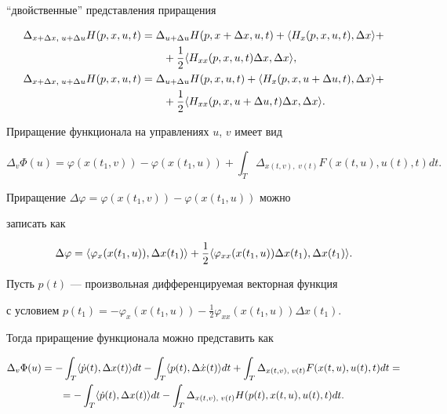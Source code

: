 ``двойственные'' представления приращения 


\begin{align}


\Delta_{x+\Delta x,\; u+\Delta u}H(p,x,u,t)&=


\Delta_{u+\Delta u}H(p,x+\Delta x,u,t)+\la


H_x(p,x,u,t),\Delta x\ra +\notag \\


&\qquad +\frac{1}{2}\la H_{xx}(p,x,u,t)\Delta x,\Delta x\ra,\\


%


\Delta_{x+\Delta x,\; u+\Delta u}H(p,x,u,t)&=


\Delta_{u+\Delta u}H(p,x,u,t)+\la H_x(p,x,u+\Delta u,t),


\Delta x\ra+ \notag \\


&\qquad +\frac{1}{2}\la H_{xx}(p,x,u+\Delta u,t)\Delta x,\Delta x\ra.


\end{align}





Приращение функционала на управлениях $u$, $v$ имеет вид


$$


\Delta_v\Phi(u)=\varphi(x(t_1,v))-\varphi(x(t_1,u))+


\int_T \Delta_{x(t,v),\; v(t)}F(x(t,u),u(t),t)dt.


$$


Приращение $\Delta\varphi=\varphi(x(t_1,v))-\varphi(x(t_1,u))$ можно 


записать как


$$


\Delta\varphi=\la \varphi_x(x(t_1,u)),\Delta x(t_1)\ra+


\frac{1}{2}\la\varphi_{xx}(x(t_1,u))\Delta x(t_1),\Delta x(t_1)\ra.


$$





Пусть $p(t)$ --- произвольная дифференцируемая векторная функция 


с условием $p(t_1)=-\varphi_x(x(t_1,u))-\frac{1}{2} 


\varphi_{xx}(x(t_1,u))\Delta x(t_1)$.


Тогда приращение функционала можно представить как


\begin{gather*}


\Delta_v\Phi(u)=-\int_T\la\Dot p(t),\Delta x(t)\ra dt


-\int_T\la p(t),\Delta\Dot x(t)\ra dt +


\int_T \Delta_{x(t,v),\;v(t)}F(x(t,u),u(t),t)dt = \\


%


=-\int_T \la\Dot p(t),\Delta x(t)\ra dt-\int_T


\Delta_{x(t,v),\; v(t)}H(p(t),x(t,u),u(t),t)dt.


\end{gather*}





